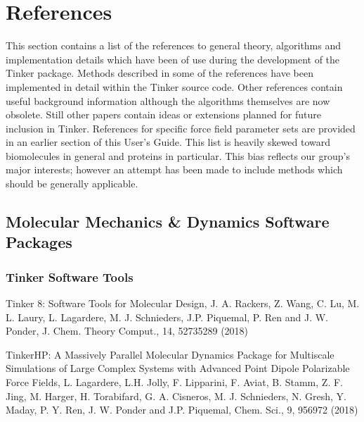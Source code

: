 \documentclass[letterpaper,11pt,english]{sphinxmanual}
\begin{document}
\chapter{References}
\label{\detokenize{text/references:references}}\label{\detokenize{text/references::doc}}
This section contains a list of the references to general theory, algorithms and implementation details which have been of use during the development of the Tinker package. Methods described in some of the references have been implemented in detail within the Tinker source code. Other references contain useful background information although the algorithms themselves are now obsolete. Still other papers contain ideas or extensions planned for future inclusion in Tinker. References for specific force field parameter sets are provided in an earlier section of this User’s Guide. This list is heavily skewed toward biomolecules in general and proteins in particular. This bias reflects our group’s major interests; however an attempt has been made to include methods which should be generally applicable.


\section{Molecular Mechanics \& Dynamics Software Packages}
\label{\detokenize{text/references:molecular-mechanics-dynamics-software-packages}}

\subsection{Tinker Software Tools}
\label{\detokenize{text/references:tinker-software-tools}}

Tinker 8: Software Tools for Molecular Design, J. A. Rackers, Z. Wang, C. Lu, M. L. Laury, L. Lagardere, M. J. Schnieders, J.\sphinxhyphen{}P. Piquemal, P. Ren and J. W. Ponder, J. Chem. Theory Comput., 14, 5273\sphinxhyphen{}5289 (2018)


Tinker\sphinxhyphen{}HP: A Massively Parallel Molecular Dynamics Package for Multiscale Simulations of Large Complex Systems with Advanced Point Dipole Polarizable Force Fields, L. Lagardere, L.\sphinxhyphen{}H. Jolly, F. Lipparini, F. Aviat, B. Stamm, Z. F. Jing, M. Harger, H. Torabifard, G. A. Cisneros, M. J. Schnieders, N. Gresh, Y. Maday, P. Y. Ren, J. W. Ponder and J.\sphinxhyphen{}P. Piquemal, Chem. Sci., 9, 956\sphinxhyphen{}972 (2018)
\end{document}

